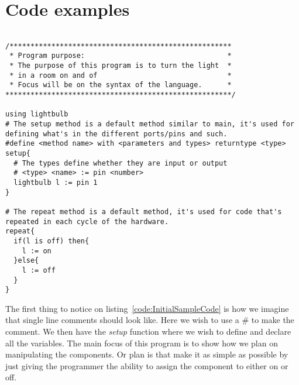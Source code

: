 \chapter{Code examples}
\begin{lstlisting}[caption={Sample code}, label={code:InitialSampleCode}]

/*****************************************************
 * Program purpose:                                  *
 * The purpose of this program is to turn the light  *
 * in a room on and of                               *
 * Focus will be on the syntax of the language.      *
******************************************************/

using lightbulb
# The setup method is a default method similar to main, it's used for defining what's in the different ports/pins and such.
#define <method name> with <parameters and types> returntype <type>
setup{
  # The types define whether they are input or output
  # <type> <name> := pin <number>
  lightbulb l := pin 1
}

# The repeat method is a default method, it's used for code that's repeated in each cycle of the hardware. 
repeat{
  if(l is off) then{
    l := on
  }else{
    l := off
  }
}

\end{lstlisting}
The first thing to notice on listing~\ref{code:InitialSampleCode} is how we imagine that single line comments should look like. 
Here we wish to use a \# to make the comment. We then have the \textit{setup} function where we wish to define and declare all the variables. 
The main focus of this program is to show how we plan on manipulating the components. Or plan is that make it as simple as possible by just giving the programmer the ability to assign the component to either on or off.

